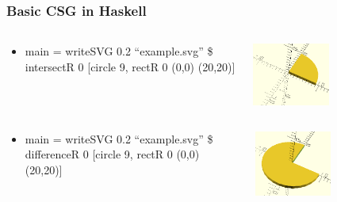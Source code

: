 \documentclass{beamer}
\begin{document}
\begin{frame}
\frametitle{Basic CSG in Haskell}
\begin{columns}
  \begin{column}{0.5\textwidth}
    \begin{itemize}
    \item main = writeSVG 0.2 ``example.svg'' \$ intersectR 0 [circle 9, rectR 0 (0,0) (20,20)]
    \end{itemize}
  \end{column}
  \begin{column}{0.5\textwidth}
    \includegraphics[width=0.5\textwidth, right]{openscad-intersection_circle_9_square_20.png}
  \end{column}
\end{columns}
\begin{columns}
  \begin{column}{0.5\textwidth}
    \begin{itemize}
    \item main = writeSVG 0.2 ``example.svg'' \$ differenceR 0 [circle 9, rectR 0 (0,0) (20,20)]
    \end{itemize}
  \end{column}
  \begin{column}{0.5\textwidth}
    \includegraphics[width=0.5\textwidth, right]{openscad-difference_circle_9_square_20.png}
  \end{column}
\end{columns}
\end{frame}
\end{document}
